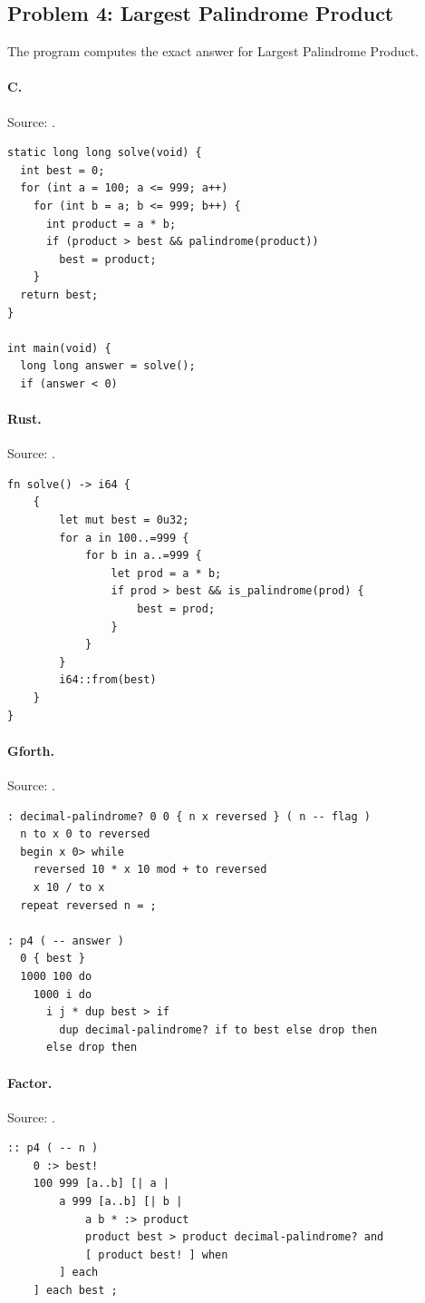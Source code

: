 \subsection{Problem 4: Largest Palindrome Product}
\label{walkthrough:p4}
The program computes the exact answer for Largest Palindrome Product.

\paragraph{C.} Source: .
\begin{lstlisting}
static long long solve(void) {
  int best = 0;
  for (int a = 100; a <= 999; a++)
    for (int b = a; b <= 999; b++) {
      int product = a * b;
      if (product > best && palindrome(product))
        best = product;
    }
  return best;
}

int main(void) {
  long long answer = solve();
  if (answer < 0)
\end{lstlisting}

\paragraph{Rust.} Source: .
\begin{lstlisting}
fn solve() -> i64 {
    {
        let mut best = 0u32;
        for a in 100..=999 {
            for b in a..=999 {
                let prod = a * b;
                if prod > best && is_palindrome(prod) {
                    best = prod;
                }
            }
        }
        i64::from(best)
    }
}
\end{lstlisting}

\paragraph{Gforth.} Source: .
\begin{lstlisting}
: decimal-palindrome? 0 0 { n x reversed } ( n -- flag )
  n to x 0 to reversed
  begin x 0> while
    reversed 10 * x 10 mod + to reversed
    x 10 / to x
  repeat reversed n = ;

: p4 ( -- answer )
  0 { best }
  1000 100 do
    1000 i do
      i j * dup best > if
        dup decimal-palindrome? if to best else drop then
      else drop then
\end{lstlisting}

\paragraph{Factor.} Source: .
\begin{lstlisting}
:: p4 ( -- n )
    0 :> best!
    100 999 [a..b] [| a |
        a 999 [a..b] [| b |
            a b * :> product
            product best > product decimal-palindrome? and
            [ product best! ] when
        ] each
    ] each best ;
\end{lstlisting}

